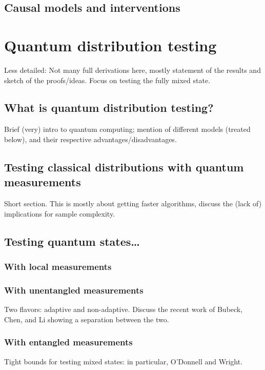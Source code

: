 \documentclass[biber]{nowfnt} %
\begin{document}
\section{Causal models and interventions}


\chapter{Quantum distribution testing}

Less detailed: Not many full derivations here, mostly statement of the results and
sketch of the proofs/ideas. Focus on testing the fully mixed state.
\section{What is quantum distribution testing?}
Brief (very) intro to quantum computing; mention of different models
(treated below), and their respective advantages/disadvantages.
\section{Testing classical distributions with quantum measurements}
Short section. This is mostly about getting faster algorithms, discuss
the (lack of) implications for sample complexity.
\section{Testing quantum states\dots}
\subsection{With local measurements}
\subsection{With unentangled measurements}
Two flavors: adaptive and non-adaptive. Discuss the recent work of
Bubeck, Chen, and Li showing a separation between the two.
\subsection{With entangled measurements}
Tight bounds for testing mixed states: in particular, O’Donnell and
Wright.

\appendix

\backmatter  %

\printbibliography
\end{document}
